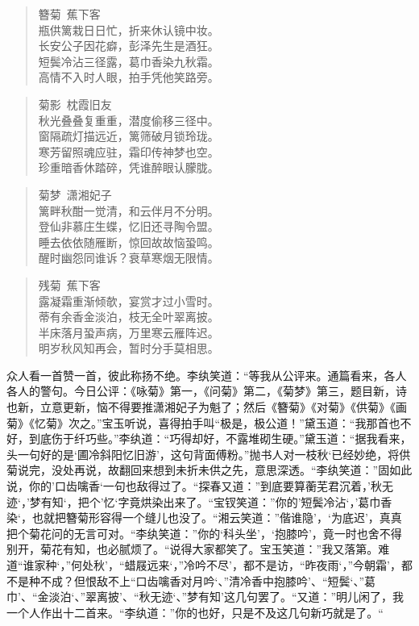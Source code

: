 \documentclass[12pt,oneside]{book}
\newenvironment{shici}{%
\begin{verse}%
\centering\large\hspace{12pt}}%
{\end{verse}}
\begin{document}
\begin{shici}
簪菊~蕉下客\\
瓶供篱栽日日忙，折来休认镜中妆。\\
长安公子因花癖，彭泽先生是酒狂。\\
短鬓冷沾三径露，葛巾香染九秋霜。\\
高情不入时人眼，拍手凭他笑路旁。
\end{shici}

\begin{shici}
菊影~枕霞旧友\\
秋光叠叠复重重，潜度偷移三径中。\\
窗隔疏灯描远近，篱筛破月锁玲珑。\\
寒芳留照魂应驻，霜印传神梦也空。\\
珍重暗香休踏碎，凭谁醉眼认朦胧。
\end{shici}

\begin{shici}
菊梦~潇湘妃子\\
篱畔秋酣一觉清，和云伴月不分明。\\
登仙非慕庄生蝶，忆旧还寻陶令盟。\\
睡去依依随雁断，惊回故故恼蛩鸣。\\
醒时幽怨同谁诉？衰草寒烟无限情。
\end{shici}

\begin{shici}
残菊~蕉下客\\
露凝霜重渐倾欹，宴赏才过小雪时。\\
蒂有余香金淡泊，枝无全叶翠离披。\\
半床落月蛩声病，万里寒云雁阵迟。\\
明岁秋风知再会，暂时分手莫相思。
\end{shici}


众人看一首赞一首，彼此称扬不绝。李纨笑道：“等我从公评来。通篇看来，各人各人的警句。今日公评：《咏菊》第一，《问菊》第二，《菊梦》第三，题目新，诗也新，立意更新，恼不得要推潇湘妃子为魁了；然后《簪菊》《对菊》《供菊》《画菊》《忆菊》次之。”宝玉听说，喜得拍手叫“极是，极公道！”黛玉道：“我那首也不好，到底伤于纤巧些。”李纨道：“巧得却好，不露堆砌生硬。”黛玉道：“据我看来，头一句好的是‘圃冷斜阳忆旧游’，这句背面傅粉。”抛书人对一枝秋‘已经妙绝，将供菊说完，没处再说，故翻回来想到未折未供之先，意思深透。“李纨笑道：”固如此说，你的’口齿噙香‘一句也敌得过了。“探春又道：”到底要算蘅芜君沉着，’秋无迹‘，’梦有知‘，把个’忆‘字竟烘染出来了。“宝钗笑道：”你的’短鬓冷沾‘，’葛巾香染‘，也就把簪菊形容得一个缝儿也没了。“湘云笑道：”偕谁隐’，‘为底迟’，真真把个菊花问的无言可对。“李纨笑道：”你的‘科头坐’，‘抱膝吟’，竟一时也舍不得别开，菊花有知，也必腻烦了。“说得大家都笑了。宝玉笑道：”我又落第。难道“谁家种‘，”何处秋’，“蜡屐远来‘，”冷吟不尽’，都不是访，“昨夜雨‘，”今朝霜’，都不是种不成？但恨敌不上“口齿噙香对月吟‘、”清冷香中抱膝吟’、“短鬓‘、”葛巾’、“金淡泊‘、”翠离披’、“秋无迹‘、”梦有知’这几句罢了。“又道：”明儿闲了，我一个人作出十二首来。“李纨道：”你的也好，只是不及这几句新巧就是了。“
\end{document}
